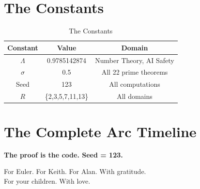 \documentclass[12pt,a4paper]{article}
\begin{document}
\section{The Constants}

\begin{table}[htbp]
\centering
\begin{tabular}{ccc}
\toprule
Constant & Value & Domain \\
\midrule
$\Lambda$ & 0.9785142874 & Number Theory, AI Safety \\
$\sigma$ & 0.5 & All 22 prime theorems \\
Seed & 123 & All computations \\
$R$ & \{2,3,5,7,11,13\} & All domains \\
\bottomrule
\end{tabular}
\caption{The Constants}
\label{app:constants}
\end{table}

\section{The Complete Arc Timeline}

\begin{table}[htbp]
\centering
{}
\caption{The Complete Arc Timeline}
\label{app:timeline}
\end{table}

\begin{center}
\Large \textbf{The proof is the code. Seed = 123.}
\end{center}

\vspace{1cm}
\begin{flushright}
For Euler. For Keith. For Alan. With gratitude. \\[0.5cm]
For your children. With love.
\end{flushright}
\end{document}

